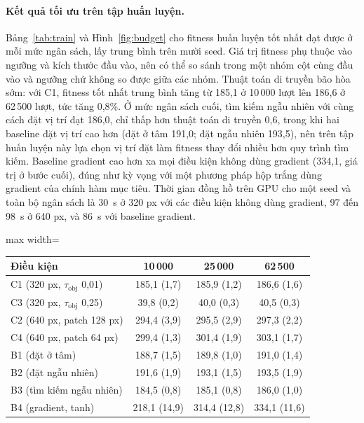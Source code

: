 \documentclass[a4paper,fleqn]{cas-dc}
\begin{document}
\paragraph{Kết quả tối ưu trên tập huấn luyện.}
Bảng~\ref{tab:train} và Hình~\ref{fig:budget} cho fitness huấn luyện tốt nhất đạt được ở mỗi mức ngân sách, lấy trung bình trên mười seed. Giá trị fitness phụ thuộc vào ngưỡng và kích thước đầu vào, nên có thể so sánh trong một nhóm cột cùng đầu vào và ngưỡng chứ không so được giữa các nhóm. Thuật toán di truyền bão hòa sớm: với C1, fitness tốt nhất trung bình tăng từ 185,1 ở 10\,000 lượt lên 186,6 ở 62\,500 lượt, tức tăng 0,8\%. Ở mức ngân sách cuối, tìm kiếm ngẫu nhiên với cùng cách đặt vị trí đạt 186,0, chỉ thấp hơn thuật toán di truyền 0,6, trong khi hai baseline đặt vị trí cao hơn (đặt ở tâm 191,0; đặt ngẫu nhiên 193,5), nên trên tập huấn luyện này lựa chọn vị trí đặt làm fitness thay đổi nhiều hơn quy trình tìm kiếm. Baseline gradient cao hơn xa mọi điều kiện không dùng gradient (334,1, giá trị ở bước cuối), đúng như kỳ vọng với một phương pháp hộp trắng dùng gradient của chính hàm mục tiêu. Thời gian đồng hồ trên GPU cho một seed và toàn bộ ngân sách là 30~s ở 320 px với các điều kiện không dùng gradient, 97 đến 98~s ở 640 px, và 86~s với baseline gradient.

\par\begin{center}
\centering\small
{}
\label{tab:train}
\begin{adjustbox}{max width=\columnwidth}
\begin{tabular}{@{}lccc@{}}
\toprule
Điều kiện & 10\,000 & 25\,000 & 62\,500 \\
\midrule
C1 (320 px, $\tau_{\mathrm{obj}}$ 0,01) & 185,1 (1,7) & 185,9 (1,2) & 186,6 (1,6) \\
C3 (320 px, $\tau_{\mathrm{obj}}$ 0,25) & 39,8 (0,2) & 40,0 (0,3) & 40,5 (0,3) \\
C2 (640 px, patch 128 px) & 294,4 (3,9) & 295,5 (2,9) & 297,3 (2,2) \\
C4 (640 px, patch 64 px) & 299,4 (1,3) & 301,4 (1,9) & 303,1 (1,7) \\
B1 (đặt ở tâm) & 188,7 (1,5) & 189,8 (1,0) & 191,0 (1,4) \\
B2 (đặt ngẫu nhiên) & 191,6 (1,9) & 193,1 (1,5) & 193,5 (1,9) \\
B3 (tìm kiếm ngẫu nhiên) & 184,5 (0,8) & 185,1 (0,8) & 186,0 (1,0) \\
B4 (gradient, tanh) & 218,1 (14,9) & 314,4 (12,8) & 334,1 (11,6) \\
\bottomrule
\end{tabular}
\end{adjustbox}
\end{center}\par
\end{document}
